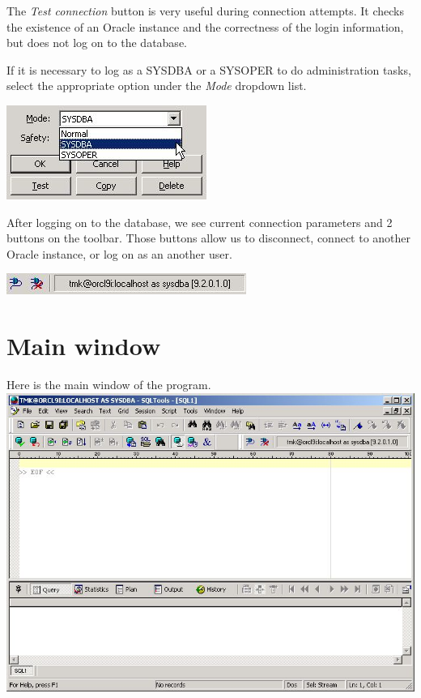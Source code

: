 \documentclass[a4paper,titlepage]{article}
\begin{document}
The \emph{Test connection} button is very useful during connection attempts. It checks the existence of an Oracle instance and the 
correctness of the login information, but does not log on to the database.

If it is necessary to log as a SYSDBA or a SYSOPER to do administration tasks, select the appropriate option
under the \emph{Mode} dropdown list.\\
\begin{center}
\includegraphics[bb=0 0 247 116,scale=.7]{00login02}
\end{center}

After logging on to the database, we see current connection parameters and 2 buttons on the toolbar. 
Those buttons allow us to disconnect, connect to another Oracle instance, or log on as an another user.\\
\begin{center}
\includegraphics[bb=0 0 296 26,scale=.7]{00login03}
\end{center}

\section{Main window}

Here is the main window of the program.\\
\includegraphics[bb=0 0 734 537,width=\textwidth]{01main00}
\end{document}
